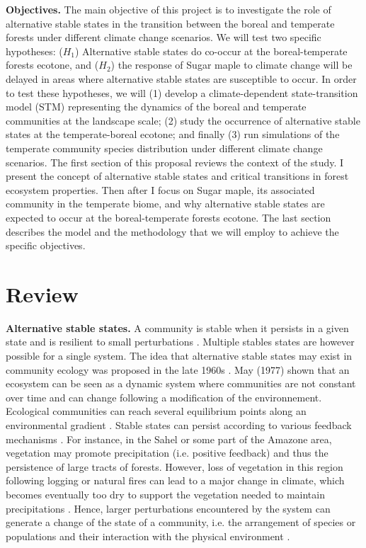 \textbf{Objectives.} The main objective of this project is to investigate the
role of alternative stable states in the transition between the boreal and
temperate forests under different climate change scenarios. We will test two
specific hypotheses: ($H_1$) Alternative stable states do co-occur at the
boreal-temperate forests ecotone, and ($H_2$) the response of Sugar maple to
climate change will be delayed in areas where alternative stable states are
susceptible to occur. In order to test these hypotheses, we will (1) develop a
climate-dependent state-transition model (STM) representing the dynamics of
the boreal and temperate communities at the landscape scale; (2) study the
occurrence of alternative stable states at the temperate-boreal ecotone; and
finally (3) run simulations of the temperate community species distribution
under different climate change scenarios. The first section of this proposal
reviews the context of the study. I present the concept of alternative stable
states and critical transitions in forest ecosystem properties. Then after I
focus on Sugar maple, its associated community in the temperate biome, and why
alternative stable states are expected to occur at the boreal-temperate
forests ecotone. The last section describes the model and the
methodology that we will employ to achieve the specific objectives.

\section{Review} 

\textbf{Alternative stable states.} A community is stable when it persists in a
given state and is resilient to small perturbations \cite{Filbee-Dexter2013}. 
Multiple stables states are however possible for a single system. The idea that alternative
stable states may exist in community ecology was proposed in the late 1960s
\cite{Scheffer2001,Society2014a}.  May (1977) \cite{May1977} shown that an
ecosystem can be seen as a dynamic system where communities are not constant
over time and can change following a modification of the environnement.
Ecological communities can reach several equilibrium points 
along an environmental gradient \cite{May1977}. Stable states can persist
according to various feedback mechanisms \cite{Filbee-Dexter2013}. For
instance, in the Sahel or some part of the Amazone area, vegetation may
promote precipitation (i.e. positive feedback) and thus the persistence of
large tracts of forests. However, loss of vegetation  in this region following
logging or natural fires can lead to a major change in climate, which becomes
eventually too dry to support the vegetation needed to maintain precipitations
\cite{scheffer2009critical}. Hence, larger perturbations encountered by the
system can generate a change of the state of a community, i.e. the arrangement
of species or populations and their interaction with the physical environment
\cite{Filbee-Dexter2013}.\\



